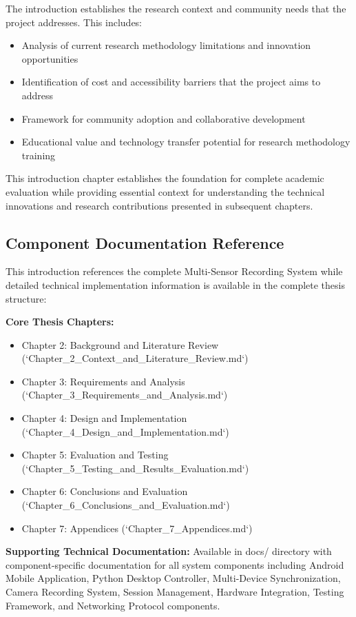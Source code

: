 \documentclass[11pt,a4paper]{article}
\begin{document}
The introduction establishes the research context and community needs that the
project addresses.  This includes:

\begin{itemize}
\item Analysis of current research methodology limitations and innovation opportunities
\item Identification of cost and accessibility barriers that the project aims to address
\item Framework for community adoption and collaborative development
\item Educational value and technology transfer potential for research methodology training

\end{itemize}
This introduction chapter establishes the foundation for complete academic evaluation
while providing essential
context for understanding the technical innovations and research contributions
presented in subsequent chapters.

\subsection{Component Documentation Reference}

This introduction references the complete Multi-Sensor Recording System while
detailed technical implementation
information is available in the complete thesis structure:

\textbf{Core Thesis Chapters:}

\begin{itemize}
\item Chapter 2: Background and Literature Review (`Chapter_2_Context_and_Literature_Review.md`)
\item Chapter 3: Requirements and Analysis (`Chapter_3_Requirements_and_Analysis.md`)
\item Chapter 4: Design and Implementation (`Chapter_4_Design_and_Implementation.md`)
\item Chapter 5: Evaluation and Testing (`Chapter_5_Testing_and_Results_Evaluation.md`)
\item Chapter 6: Conclusions and Evaluation (`Chapter_6_Conclusions_and_Evaluation.md`)
\item Chapter 7: Appendices (`Chapter_7_Appendices.md`)

\end{itemize}
\textbf{Supporting Technical Documentation:}
Available in docs/ directory with component-specific documentation for
all system components including Android Mobile Application, Python Desktop
Controller, Multi-Device Synchronization,
Camera Recording System, Session Management, Hardware Integration, Testing Framework,
and Networking Protocol
components.
\end{document}
